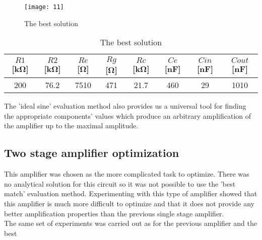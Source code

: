 \begin{figure}[H]
    \centerline{\texttt{[image: 11]}\label{better-solution-fig}}
    \caption{The best solution}
\end{figure}

\begin{table}[H]
\centering
\begin{tabular}{@{}cccccccc@{}}
\toprule
    $R1$ [\si{\kilo\ohm}] & $R2$ [\si{\kilo\ohm}] & $Re$ [\si{\ohm}] & $Rg$ [\si{\ohm}] & $Rc$ [\si{\kilo\ohm}] & $Ce$ [\si{\nano\farad}] & $Cin$ [\si{\nano\farad}] & $Cout$ [\si{\nano\farad}] \\
    \midrule
    200   & 76.2 & 7510  & 471 & 21.7 & 460     & 29    & 1010 \\
    \bottomrule
\end{tabular}
\caption{The best solution}
\label{better-solution-tab}
\end{table}

The 'ideal sine' evaluation method also provides us a universal tool for finding the appropriate components' values which produce an arbitrary amplification of the amplifier up to the maximal amplitude.

\subsection{Two stage amplifier optimization} \label{2stage-results}
This amplifier was chosen as the more complicated task to optimize. There was no analytical solution for this circuit so it was not possible to use the 'best match' evaluation method. Experimenting with this type of amplifier showed that this amplifier is much more difficult to optimize and that it does not provide any better amplification properties than the previous single stage amplifier.\\
The same set of experiments was carried out as for the previous amplifier and the best